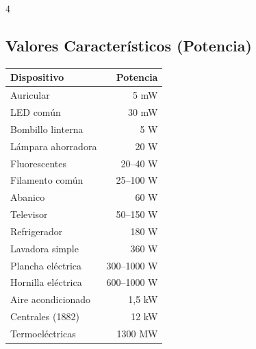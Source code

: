 \documentclass[9pt, landscape, letterpaper]{extarticle}
\begin{document}
\begin{multicols}{4}
  \subsection{Valores Característicos (Potencia)}

  \begin{tablabox}
    \tablacompacta
    \setlength{\tabcolsep}{-6pt}
    \begin{tabular}{@{}p{3.8cm}r@{}}
      \toprule
      Dispositivo        & Potencia    \\
      \midrule
      Auricular          & 5 mW        \\
      LED común          & 30 mW       \\
      Bombillo linterna  & 5 W         \\
      Lámpara ahorradora & 20 W        \\
      Fluorescentes      & 20--40 W    \\
      Filamento común    & 25--100 W   \\
      Abanico            & 60 W        \\
      Televisor          & 50--150 W   \\
      Refrigerador       & 180 W       \\
      Lavadora simple    & 360 W       \\
      Plancha eléctrica  & 300--1000 W \\
      Hornilla eléctrica & 600--1000 W \\
      Aire acondicionado & 1,5 kW      \\
      Centrales (1882)   & 12 kW       \\
      Termoeléctricas    & 1300 MW     \\
      \bottomrule
    \end{tabular}
  \end{tablabox}

\end{multicols}

\end{document}
